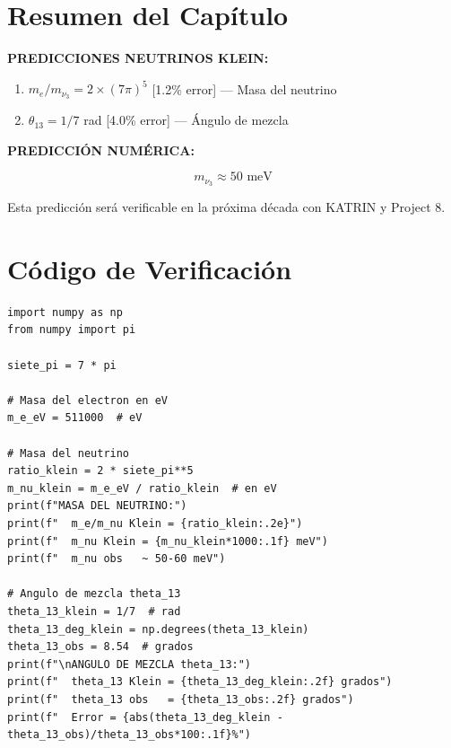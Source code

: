\section{Resumen del Capítulo}

\begin{tcolorbox}[colback=kleingray, colframe=kleinblue, title=\textbf{Resumen del Capítulo 8}]

\textbf{PREDICCIONES NEUTRINOS KLEIN:}

\begin{enumerate}
    \item $m_e/m_{\nu_3} = 2 \times (7\pi)^5$ \hfill [1.2\% error] --- Masa del neutrino
    \item $\theta_{13} = 1/7$ rad \hfill [4.0\% error] --- Ángulo de mezcla
\end{enumerate}

\vspace{0.3cm}
\textbf{PREDICCIÓN NUMÉRICA:}

\begin{equation}
m_{\nu_3} \approx 50 \text{ meV}
\end{equation}

Esta predicción será verificable en la próxima década con KATRIN y Project 8.

\end{tcolorbox}


\section*{Código de Verificación}

\begin{lstlisting}[caption={Verificación numérica - Capítulo 8}]
import numpy as np
from numpy import pi

siete_pi = 7 * pi

# Masa del electron en eV
m_e_eV = 511000  # eV

# Masa del neutrino
ratio_klein = 2 * siete_pi**5
m_nu_klein = m_e_eV / ratio_klein  # en eV
print(f"MASA DEL NEUTRINO:")
print(f"  m_e/m_nu Klein = {ratio_klein:.2e}")
print(f"  m_nu Klein = {m_nu_klein*1000:.1f} meV")
print(f"  m_nu obs   ~ 50-60 meV")

# Angulo de mezcla theta_13
theta_13_klein = 1/7  # rad
theta_13_deg_klein = np.degrees(theta_13_klein)
theta_13_obs = 8.54  # grados
print(f"\nANGULO DE MEZCLA theta_13:")
print(f"  theta_13 Klein = {theta_13_deg_klein:.2f} grados")
print(f"  theta_13 obs   = {theta_13_obs:.2f} grados")
print(f"  Error = {abs(theta_13_deg_klein - theta_13_obs)/theta_13_obs*100:.1f}%")
\end{lstlisting}
